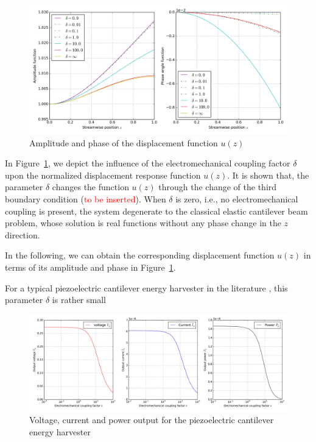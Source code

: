 \documentclass{article}
\begin{document}
\begin{figure}[!htbp]
    \centering
    \includegraphics[width=\textwidth]{./img_eig_asy/fig_sol_analytic_disp_fun.jpg}
    \caption{Amplitude and phase of the displacement function $u(z)$ }
    \label{fig:fig_sol_analytic_disp_fun}
\end{figure}


In Figure~\ref{fig:fig_sol_analytic_disp_fun}, we depict the influence of the electromechanical coupling factor $\delta$ upon the normalized displacement response function $u(z)$. It is shown that, the parameter $\delta$ changes the function $u(z)$ through the change of the third boundary condition (\textcolor{red}{to be inserted}). When $\delta$ is zero, i.e., no electromechanical coupling is present, the system degenerate to the classical elastic cantilever beam problem, whose solution is real functions without any phase change in the $z$ direction. 


In the following, we can obtain the corresponding displacement function $u(z)$ in terms of its amplitude and phase in Figure~\ref{fig:fig_sol_analytic_disp_fun}. 


For a typical piezoelectric cantilever energy harvester in the literature \cite{erturk2008distributed,erturk2009experimentally}, this parameter $\delta$ is rather small

\begin{figure}[!htbp]
    \centering
    \includegraphics[width=\textwidth]{./img_eig_asy/fig_sol_analytic_perf_fun.jpg}
    \caption{Voltage, current and power output for the piezoelectric cantilever energy harvester}
    \label{fig:fig_sol_analytic_perf_fun}
\end{figure}
\end{document}
